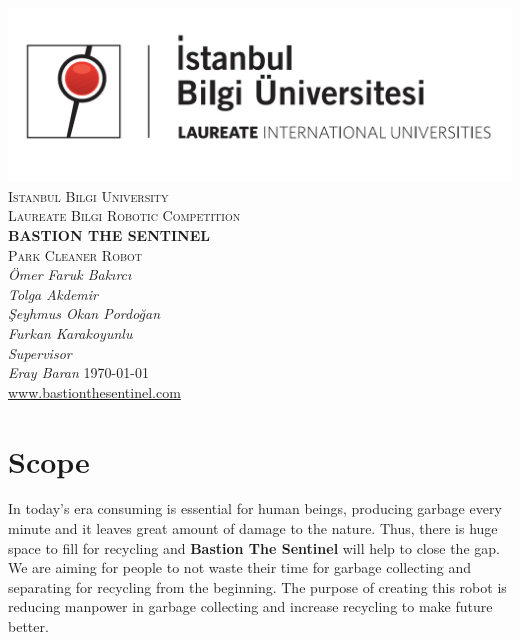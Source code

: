 \documentclass[12pt,a4paper]{article}
\begin{document}
\begin{titlepage}
 \centering
 \includegraphics[scale=0.3]{bilgi_logo}\\
 {\scshape\LARGE Istanbul Bilgi University\\}
 \vspace{1cm}
 {\scshape\Large Laureate Bilgi Robotic Competition\\}
 \vspace{2cm}
 {\huge\bfseries BASTION THE SENTINEL\\}
 {\scshape\Large Park Cleaner Robot\\}
 \vspace{2cm}
 {\Large\itshape Ömer Faruk Bakırcı\\}
 {\Large\itshape Tolga Akdemir\\}
 {\Large\itshape Şeyhmus Okan Pordoğan\\}
 {\Large\itshape Furkan Karakoyunlu\\}
 \vspace{4cm}
 {\Large\itshape Supervisor\\Eray Baran}
 \vfill
 \vfill
 {\large \today\\}
 \href{http://www.bastionthesentinel.com}{www.bastionthesentinel.com}
\end{titlepage}


\tableofcontents
\pagebreak

\section{Scope}
 \begin{flushleft}
  In today's era consuming is essential for human beings, producing garbage every minute and it leaves great amount of damage 
  to the nature. Thus, there is huge space to fill for recycling 
  and \textbf{Bastion The Sentinel} will help to close the gap. We are aiming for people to not waste their time for garbage 
  collecting and separating for recycling from the beginning. The purpose of creating this robot is reducing manpower in 
  garbage collecting and increase recycling to make future better.
 \end{flushleft}
  
\end{document}
